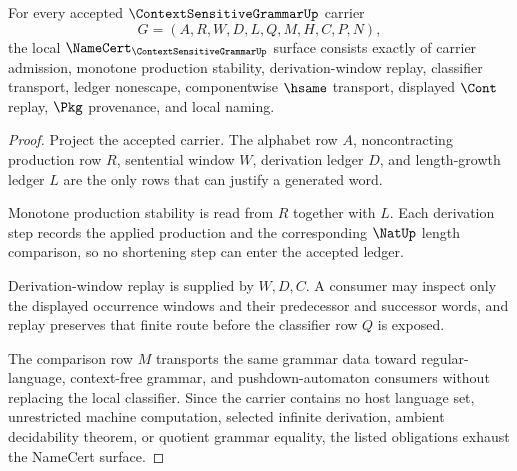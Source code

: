 \begin{theorem}
\label{thm:context-sensitive-grammar-namecert-obligations}
For every accepted $\ContextSensitiveGrammarUp$ carrier
$$
G=(A,R,W,D,L,Q,M,H,C,P,N),
$$
the local $\NameCert_{\ContextSensitiveGrammarUp}$ surface consists exactly of carrier admission, monotone production stability, derivation-window replay, classifier transport, ledger nonescape, componentwise $\hsame$ transport, displayed $\Cont$ replay, $\Pkg$ provenance, and local naming.
\end{theorem}
\begin{proof}
Project the accepted carrier. The alphabet row $A$, noncontracting production row $R$, sentential window $W$, derivation ledger $D$, and length-growth ledger $L$ are the only rows that can justify a generated word.

Monotone production stability is read from $R$ together with $L$. Each derivation step records the applied production and the corresponding $\NatUp$ length comparison, so no shortening step can enter the accepted ledger.

Derivation-window replay is supplied by $W,D,C$. A consumer may inspect only the displayed occurrence windows and their predecessor and successor words, and replay preserves that finite route before the classifier row $Q$ is exposed.

The comparison row $M$ transports the same grammar data toward regular-language, context-free grammar, and pushdown-automaton consumers without replacing the local classifier. Since the carrier contains no host language set, unrestricted machine computation, selected infinite derivation, ambient decidability theorem, or quotient grammar equality, the listed obligations exhaust the NameCert surface.
\end{proof}

